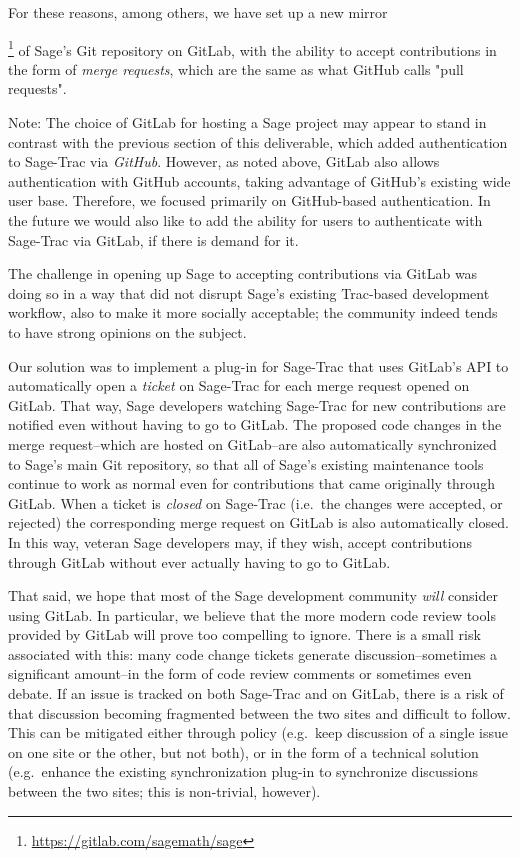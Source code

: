 For these reasons, among others, we have set up a new
mirror{\footnote{\url{https://gitlab.com/sagemath/sage}} of Sage's Git
repository on GitLab, with the ability to accept contributions in the form of
{\em merge requests}, which are the same as what GitHub calls "pull requests".

Note: The choice of GitLab for hosting a Sage project may appear to stand in
contrast with the previous section of this deliverable, which added
authentication to Sage-Trac via {\em GitHub}.  However, as noted above, GitLab
also allows authentication with GitHub accounts, taking advantage of GitHub's
existing wide user base.  Therefore, we focused primarily on GitHub-based
authentication.  In the future we would also like to add the ability for users
to authenticate with Sage-Trac via GitLab, if there is demand for it.

The challenge in opening up Sage to accepting contributions via GitLab was
doing so in a way that did not disrupt Sage's existing Trac-based
development workflow, also to make it more socially
acceptable; the community indeed tends to have strong opinions on the subject.

Our solution was to implement a plug-in for Sage-Trac that
uses GitLab's API to automatically open a {\em ticket} on Sage-Trac for each
merge request opened on GitLab.  That way, Sage developers watching Sage-Trac
for new contributions are notified even without having to go to GitLab.  The
proposed code changes in the merge request--which are hosted on GitLab--are
also automatically synchronized to Sage's main Git repository, so that all of
Sage's existing maintenance tools continue to work as normal even for
contributions that came originally through GitLab.  When a ticket is {\em
closed} on Sage-Trac (i.e.~the changes were accepted, or rejected) the
corresponding merge request on GitLab is also automatically closed.  In this
way, veteran Sage developers may, if they wish, accept contributions through
GitLab without ever actually having to go to GitLab.

That said, we hope that most of the Sage development community {\em will}
consider using GitLab.  In particular, we believe that the more modern code
review tools provided by GitLab will prove too compelling to ignore.  There
is a small risk associated with this: many code change tickets generate 
discussion--sometimes a significant amount--in the form of code review comments
or sometimes even debate.  If an issue is tracked on both Sage-Trac and on
GitLab, there is a risk of that discussion becoming fragmented between the two
sites and difficult to follow.  This can be mitigated either through policy
(e.g.~keep discussion of a single issue on one site or the other, but not
both), or in the form of a technical solution (e.g.~enhance the existing
synchronization plug-in to synchronize discussions between the two sites; this
is non-trivial, however).

}
